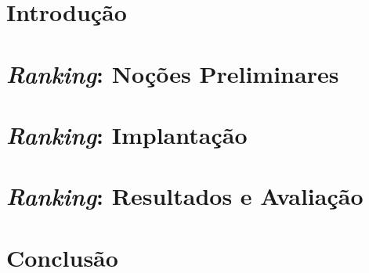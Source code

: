 \documentclass[12pt, a4paper, normaltoc, capchap, capsec, times]{abnt}
\begin{document}
\chapter{Introdução}
\label{chap:introducao}


\chapter{\emph{Ranking}: Noções Preliminares}
\label{chap:nocoes_preliminares}


\chapter{\emph{Ranking}: Implantação}
\label{chap:implantacao}


\chapter{\emph{Ranking}: Resultados e Avaliação}
\label{chap:avaliacao}


\chapter{Conclusão}
\label{chap:conclusao}



\end{document}

